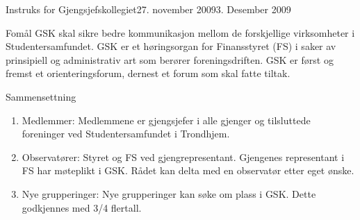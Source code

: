 
\begin{instruks}{Instruks for Gjengsjefskollegiet}{27. november 2009}{3. Desember 2009}

    \begin{instruksledd}{Fomål}
        GSK skal sikre bedre kommunikasjon mellom de forskjellige virksomheter i
        Studentersamfundet.
        GSK er et høringsorgan for Finansstyret (FS) i saker av prinsipiell og
        administrativ art som berører
        foreningsdriften. GSK er først og fremst et orienteringsforum, dernest et forum
        som skal fatte tiltak.
    \end{instruksledd}

    \begin{instruksledd}{Sammensettning}
        \begin{enumerate}
            \item Medlemmer:
                Medlemmene er gjengsjefer i alle gjenger og tilsluttede foreninger ved
                Studentersamfundet i Trondhjem.
            \item Observatører:
                Styret og FS ved gjengrepresentant. Gjengenes representant i FS har møteplikt i
                GSK. Rådet kan delta med
                en observatør etter eget ønske.
            \item Nye grupperinger:
                Nye grupperinger kan søke om plass i GSK. Dette godkjennes med 3/4 flertall.
        \end{enumerate}
    \end{instruksledd}


\end{instruks}
